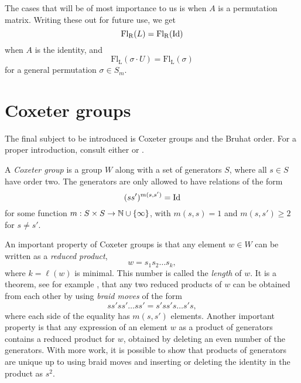 The cases that will be of most importance to us is when $A$ is a
permutation matrix. Writing these out for future use, we get
\[  \mathrm{Fl_R}(L) = \mathrm{Fl_R}(\operatorname{Id}) \]
when $A$ is the identity, and
\[  \mathrm{Fl_L}(\sigma \cdot U) = \mathrm{Fl_L}(\sigma) \]
for a general permutation $\sigma\in S_m$.

\section{Coxeter groups}
\label{sec:bruhat}

The final subject to be introduced is Coxeter groups and the Bruhat
order. For a proper introduction, consult either \cite{bjorner} or
\cite{hiller}.

\begin{definition}
  A \textit{Coxeter group} is a group $W$ along with a set of
  generators $S$,
  where all $s \in S$ have order two. The generators are only allowed
  to have relations of the form
  \[ (s s')^{m(s,s')} = \operatorname{Id} \]
  for some function $m : S \times S \to \mathbb{N}\cup\left\{ \infty \right\}$, with
  $m(s,s) = 1$ and $m(s,s') \geq 2$ for $s\neq s'$.
\end{definition}

An important property of Coxeter groups is that any element $w \in W$
can be written as a \textit{reduced product},
\[ w = s_1 s_2 \dots s_k, \]
where $k = \ell(w)$ is minimal. This number is called the
\textit{length} of $w$. It is a theorem, see for example \cite[Chapter
1.5]{bjorner}, that any two reduced products of $w$ can be obtained
from each other by using \textit{braid moves} of the form
\[ s s' s s' \dots s s' = s' s s' s \dots s' s, \]
where each side of the equality has $m(s,s')$ elements. Another
important property is that any expression of an element $w$ as a
product of generators contains a reduced product for $w$, obtained by
deleting an even number of the generators. With more
work, it is possible to show that products of generators are unique up
to using braid moves and inserting or deleting the identity in the
product as $s^2$.

